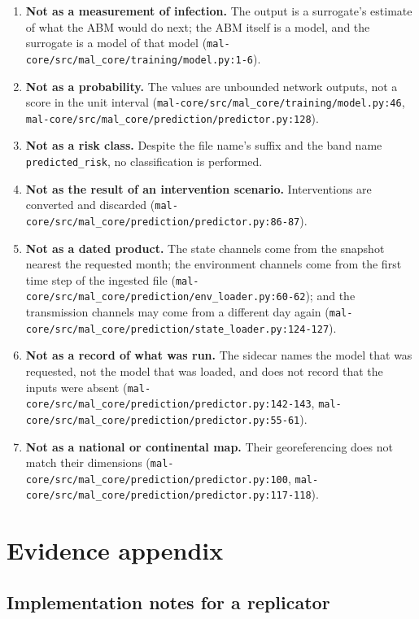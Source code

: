 \documentclass[11pt,a4paper]{article}
\newcommand{\code}[1]{\texttt{#1}}
\begin{document}
\begin{enumerate}
\item \textbf{Not as a measurement of infection.} The output is a surrogate's
  estimate of what the ABM would do next; the ABM itself is a model, and
  the surrogate is a model of that model
  (\code{mal-core/src/mal\_core/training/model.py:1-6}).
\item \textbf{Not as a probability.} The values are unbounded network
  outputs, not a score in the unit interval
  (\code{mal-core/src/mal\_core/training/model.py:46},
  \code{mal-core/src/mal\_core/prediction/predictor.py:128}).
\item \textbf{Not as a risk class.} Despite the file name's suffix and the
  band name \code{predicted\_risk}, no classification is performed.
\item \textbf{Not as the result of an intervention scenario.} Interventions
  are converted and discarded
  (\code{mal-core/src/mal\_core/prediction/predictor.py:86-87}).
\item \textbf{Not as a dated product.} The state channels come from the
  snapshot nearest the requested month; the environment channels come from
  the first time step of the ingested file
  (\code{mal-core/src/mal\_core/prediction/env\_loader.py:60-62}); and the
  transmission channels may come from a different day again
  (\code{mal-core/src/mal\_core/prediction/state\_loader.py:124-127}).
\item \textbf{Not as a record of what was run.} The sidecar names the model
  that was requested, not the model that was loaded, and does not record
  that the inputs were absent
  (\code{mal-core/src/mal\_core/prediction/predictor.py:142-143},
  \code{mal-core/src/mal\_core/prediction/predictor.py:55-61}).
\item \textbf{Not as a national or continental map.} Their georeferencing
  does not match their dimensions
  (\code{mal-core/src/mal\_core/prediction/predictor.py:100},
  \code{mal-core/src/mal\_core/prediction/predictor.py:117-118}).
\end{enumerate}

\section{Evidence appendix}

\subsection{Implementation notes for a replicator}
\end{document}
